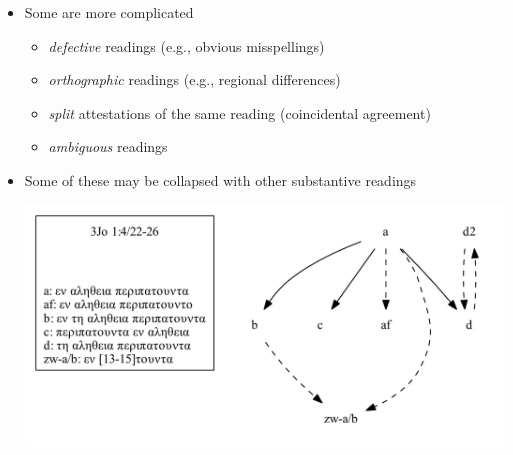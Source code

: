 \documentclass[10pt]{beamer}
\begin{document}
	\begin{frame}
		\begin{itemize}
			\item Some are more complicated
			\begin{itemize}
				\item \emph{defective} readings (e.g., obvious misspellings)
				\item \emph{orthographic} readings (e.g., regional differences)
				\item \emph{split} attestations of the same reading (coincidental agreement)
				\item \emph{ambiguous} readings
			\end{itemize}
			\item Some of these may be collapsed with other substantive readings
			\begin{center}
				\includegraphics[scale=0.5]{../img/B25K1V4U22-26-local-stemma-ignore-defective-ignore-ambiguous-merge-splits.pdf}
			\end{center}
		\end{itemize}
	\end{frame}
\end{document}
